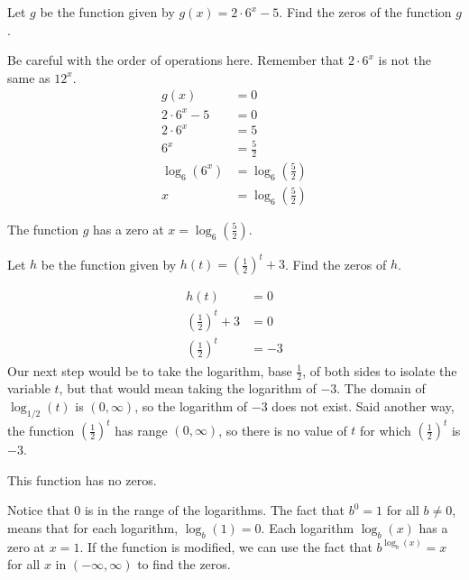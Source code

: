 \documentclass[nooutcomes]{ximera}
\begin{document}
	\begin{example}

		Let $g$ be the function given by $g(x) =  2 \cdot 6^x - 5$. Find the zeros of the function $g$.
	
		\begin{explanation} 

			Be careful with the order of operations here. Remember that $2\cdot 6^x$ is not the same as $12^x$.
			\begin{align*}
				g(x) & =  0 \\
				2 \cdot 6^x - 5 & =  0 \\
				2 \cdot 6^x &= 5\\
				6^x &= \frac{5}{2}\\
				\log_6( 6^x ) &= \log_6\left( \frac{5}{2} \right) \\
				x &= \log_6\left( \frac{5}{2} \right)
			\end{align*}			
					
			The function $g$ has a zero at $x = \log_6\left( \frac{5}{2} \right)$.
		\end{explanation}
	\end{example}
	
	\begin{example}
		Let $h$ be the function given by $h(t) =  \left(\frac{1}{2}\right)^t + 3$. Find the zeros of $h$.
	
		\begin{explanation} 
			
			\begin{align*}
				h(t) & = 0\\
				\left(\frac{1}{2}\right)^t + 3 &= 0\\
				\left(\frac{1}{2}\right)^t &= - 3
			\end{align*}			
			Our next step would be to take the logarithm, base $\frac{1}{2}$, of both sides to isolate the variable $t$, but that would mean taking the logarithm of $-3$. 
			The domain of $\log_{1/2}(t)$ is $(0,\infty)$, so the logarithm of $-3$ does not exist. Said another way, the function $\left( \frac{1}{2} \right)^t$ has
			range $(0,\infty)$, so there is no value of $t$ for which $\left( \frac{1}{2} \right)^t$ is $-3$.
			
			This function has no zeros.

		\end{explanation}
	\end{example}

	Notice that $0$ is in the range of the logarithms. The fact that $b^0 = 1$ for all $b \neq 0$, means that for each logarithm, $\log_b(1) = 0$. Each logarithm $\log_b(x)$ has a zero at $x=1$. 
	If the function is modified, we can use the fact that $b^{\log_b(x)} = x$ for all $x$ in $(-\infty, \infty)$ to find the zeros.
		
\end{document}
